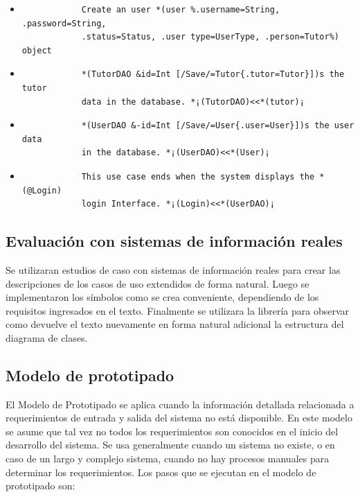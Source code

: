 \documentclass[12pt,a4paper,final, xcolor=table, table]{article}
\begin{document}
	\begin{itemize}
		\item \begin{verbatim}
			Create an user *(user %.username=String, .password=String,
			.status=Status, .user type=UserType, .person=Tutor%) object
		\end{verbatim}
		
		\item \begin{verbatim}
			*(TutorDAO &id=Int [/Save/=Tutor{.tutor=Tutor}])s the tutor 
			data in the database. *¡(TutorDAO)<<*(tutor)¡
		\end{verbatim}
	
		\item \begin{verbatim}
			*(UserDAO &-id=Int [/Save/=User{.user=User}])s the user data 
			in the database. *¡(UserDAO)<<*(User)¡
		\end{verbatim}
	
		\item \begin{verbatim}
			This use case ends when the system displays the *(@Login) 
			login Interface. *¡(Login)<<*(UserDAO)¡
		\end{verbatim}
		
	\end{itemize}
	
	\subsection{Evaluación con sistemas de información reales}
	
	Se utilizaran estudios de caso con sistemas de información reales para crear las descripciones de los casos de uso extendidos de forma natural. Luego se implementaron los símbolos como se crea conveniente, dependiendo de los requisitos ingresados en el texto. Finalmente se utilizara la librería para observar como devuelve el texto nuevamente en forma natural adicional la estructura del diagrama de clases.
	
	\subsection{Modelo de prototipado}
	El Modelo de Prototipado se aplica cuando la información detallada relacionada a requerimientos de entrada y salida del sistema no está disponible. En este modelo se asume que tal vez no todos los requerimientos son conocidos en el inicio del desarrollo del sistema. Se usa generalmente cuando un sistema no existe, o en caso de un largo y complejo sistema, cuando no hay procesos manuales para determinar los requerimientos. Los pasos que se ejecutan en el modelo de prototipado son: 
	
\end{document}
